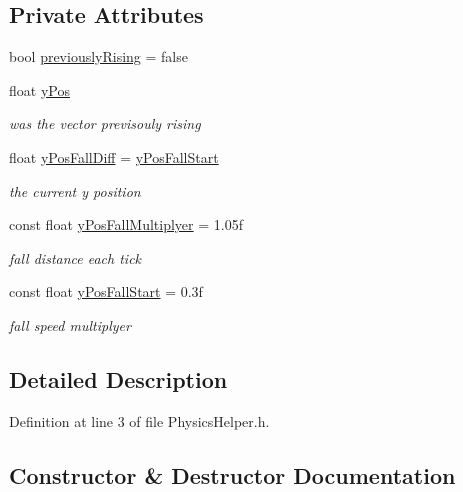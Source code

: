 \subsection*{Private Attributes}
\begin{DoxyCompactItemize}
\item 
bool \mbox{\hyperlink{class_physics_helper_a49302833da6c4ac21bf17891de2c696e}{previously\+Rising}} = false
\item 
float \mbox{\hyperlink{class_physics_helper_a8d1eda19cdbede456e4fb973a19802a4}{y\+Pos}}
\begin{DoxyCompactList}\small\item\em was the vector previsouly rising \end{DoxyCompactList}\item 
float \mbox{\hyperlink{class_physics_helper_a0c1293f0d07c93ffa688f67285327d35}{y\+Pos\+Fall\+Diff}} = \mbox{\hyperlink{class_physics_helper_a11582a39916e5ec33325d99d1d67235a}{y\+Pos\+Fall\+Start}}
\begin{DoxyCompactList}\small\item\em the current y position \end{DoxyCompactList}\item 
const float \mbox{\hyperlink{class_physics_helper_a20ab7f606d89b0b12ffdd0a68136da2e}{y\+Pos\+Fall\+Multiplyer}} = 1.\+05f
\begin{DoxyCompactList}\small\item\em fall distance each tick \end{DoxyCompactList}\item 
const float \mbox{\hyperlink{class_physics_helper_a11582a39916e5ec33325d99d1d67235a}{y\+Pos\+Fall\+Start}} = 0.\+3f
\begin{DoxyCompactList}\small\item\em fall speed multiplyer \end{DoxyCompactList}\end{DoxyCompactItemize}


\subsection{Detailed Description}


Definition at line 3 of file Physics\+Helper.\+h.



\subsection{Constructor \& Destructor Documentation}
\mbox{\label{class_physics_helper_a10d1d4db3800e658fc8bbd718fb6080a}} 
